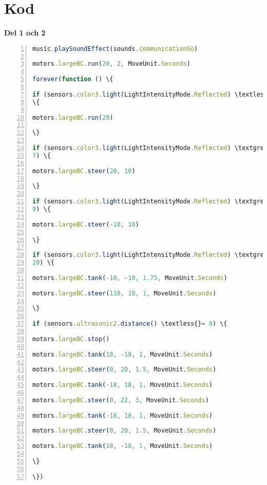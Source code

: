 \documentclass{article}
\begin{document}
\section{Kod}
{\setlength{\parindent}{0cm}
\textbf{Del 1 och 2}
}\newline

\begin{lstlisting}[language=JavaScript, numbers=left]
music.playSoundEffect(sounds.communicationGo)

motors.largeBC.run(20, 2, MoveUnit.Seconds)

forever(function () \{

if (sensors.color3.light(LightIntensityMode.Reflected) \textless{}= 5)
\{

motors.largeBC.run(20)

\}

if (sensors.color3.light(LightIntensityMode.Reflected) \textgreater{}=
7) \{

motors.largeBC.steer(20, 10)

\}

if (sensors.color3.light(LightIntensityMode.Reflected) \textgreater{}=
9) \{

motors.largeBC.steer(-10, 10)

\}

if (sensors.color3.light(LightIntensityMode.Reflected) \textgreater{}=
20) \{

motors.largeBC.tank(-10, -10, 1.75, MoveUnit.Seconds)

motors.largeBC.steer(118, 10, 1, MoveUnit.Seconds)

\}

if (sensors.ultrasonic2.distance() \textless{}= 8) \{

motors.largeBC.stop()

motors.largeBC.tank(18, -18, 1, MoveUnit.Seconds)

motors.largeBC.steer(0, 20, 1.5, MoveUnit.Seconds)

motors.largeBC.tank(-18, 18, 1, MoveUnit.Seconds)

motors.largeBC.steer(0, 22, 3, MoveUnit.Seconds)

motors.largeBC.tank(-18, 18, 1, MoveUnit.Seconds)

motors.largeBC.steer(0, 20, 1.5, MoveUnit.Seconds)

motors.largeBC.tank(18, -18, 1, MoveUnit.Seconds)

\}

\})

\end{lstlisting}
\end{document}
